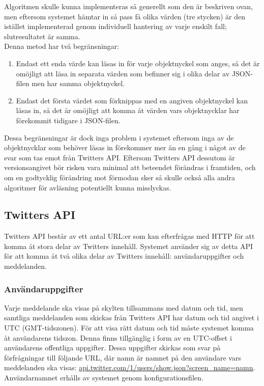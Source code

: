 \documentclass[a4paper,11pt]{article}
\begin{document}
Algoritmen skulle kunna implementeras så generellt som den är beskriven ovan, men eftersom systemet hämtar in så pass få olika värden (tre stycken) är den istället implementerad genom individuell hantering av varje enskilt fall; slutresultatet är samma.\\

Denna metod har två begränsningar:

	\begin{enumerate}
    	\item Endast ett enda värde kan läsas in för varje objektnyckel som anges, så det är omöjligt att läsa in separata värden som befinner sig i olika delar av JSON-filen men har samma objektnyckel.
    	\item Endast det första värdet som förknippas med en angiven objektnyckel kan läsas in, så det är omöjligt att komma åt värden vars objektnycklar har förekommit tidigare i JSON-filen.
	\end{enumerate}

Dessa begränsningar är dock inga problem i systemet eftersom inga av de objektnycklar som behöver läsas in förekommer mer än en gång i något av de svar som tas emot från Twitters API. Eftersom Twitters API dessutom är versionsangivet bör risken vara minimal att beteendet förändras i framtiden, och om en godtycklig förändring mot förmodan sker så skulle också alla andra algoritmer för avläsning potentiellt kunna misslyckas.

\subsection{Twitters API}
Twitters API består av ett antal URL:er som kan efterfrågas med HTTP för att komma åt stora delar av Twitters innehåll. Systemet använder sig av detta API för att komma åt två olika delar av Twitters innehåll: användaruppgifter och meddelanden.

\subsubsection{Användaruppgifter}

Varje meddelande ska visas på skylten tillsammans med datum och tid, men samtliga meddelanden som skickas från Twitters API har datum och tid angivet i UTC (GMT-tidszonen). För att visa rätt datum och tid måste systemet komma åt användarens tidszon. Denna finns tillgänglig i form av en UTC-offset i användarens offentliga uppgifter. Dessa uppgifter skickas som svar på förfrågningar till följande URL, där namn är namnet på den användare vars meddelanden ska visas: \url{api.twitter.com/1/users/show.json?screen_name=namn}. Användarnamnet erhålls av systemet genom konfigurationsfilen.\\
\end{document}
